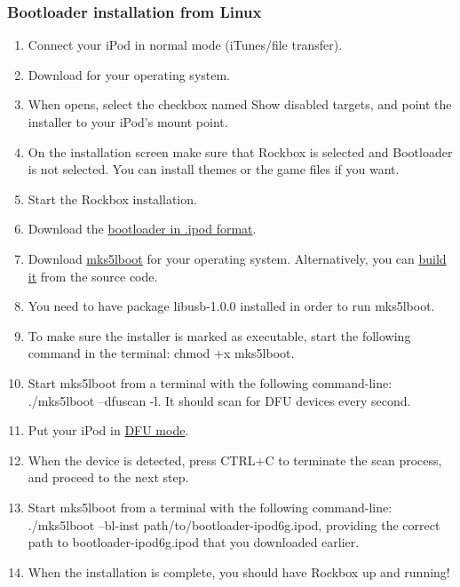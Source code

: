 \subsubsection{Bootloader installation from Linux}

\begin{enumerate}

\item Connect your iPod in normal mode (iTunes/file transfer).
\item Download  for your operating system.
\item When  opens, select the checkbox named Show disabled targets, and point the installer to your iPod's mount point.
\item On the installation screen make sure that Rockbox is selected and Bootloader is not selected. You can install themes or the game files if you want.
\item Start the Rockbox installation.
\item Download the \href{https://files.freemyipod.org/~user890104/bootloader-ipodclassic-v1_0/bootloader-ipod6g.ipod}{bootloader in .ipod format}.
\item Download \href{https://files.freemyipod.org/~user890104/bootloader-ipodclassic.html#download_stable}{mks5lboot} for your operating system. Alternatively, you can \href{https://files.freemyipod.org/~user890104/bootloader-ipodclassic.html#build_mks5lboot}{build it} from the source code.
\item You need to have package libusb-1.0.0 installed in order to run mks5lboot.
\item To make sure the installer is marked as executable, start the following command in the terminal: chmod +x mks5lboot.
\item Start mks5lboot from a terminal with the following command-line: ./mks5lboot --dfuscan -l. It should scan for DFU devices every second.
\item Put your iPod in \href{https://files.freemyipod.org/~user890104/bootloader-ipodclassic.html#dfu}{DFU mode}.
\item When the device is detected, press CTRL+C to terminate the scan process, and proceed to the next step.
\item Start mks5lboot from a terminal with the following command-line: ./mks5lboot --bl-inst path/to/bootloader-ipod6g.ipod, providing the correct path to bootloader-ipod6g.ipod that you downloaded earlier.
\item When the installation is complete, you should have Rockbox up and running!

\end{enumerate}
